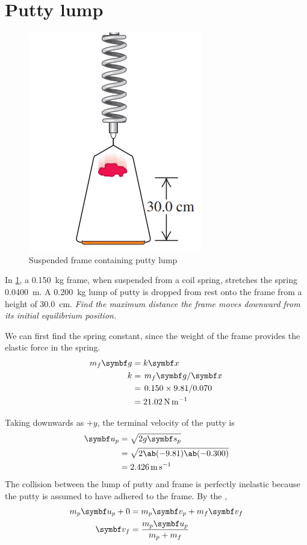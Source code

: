 \section{Putty lump}
\begin{figure}
  \centering
  \includegraphics[scale=0.5]{assets/puttylump.png}
  \caption{Suspended frame containing putty lump}
  \label{fig:puttylump}
\end{figure}
In \cref{fig:puttylump}, a \qty{0.150}{\kg} frame, when suspended from a coil
spring, stretches the spring \qty{0.0400}{\metre}. A \qty{0.200}{\kg} lump of
putty is dropped from rest onto the frame from a height of \qty{30.0}{\cm}.
\it{Find the maximum distance the frame moves downward from its
initial equilibrium position.}

We can first find the spring constant, since the weight of the frame
provides the elastic force in the spring.
\begin{align*}
  m_f\mv{g} &= k\mv{x} \\
  k &= \lf{m_f\mv{g}}{\mv{x}} \\
  &= \lf{0.150\times 9.81}{0.070} \\
  &= \qty{21.02}{\newton\per\metre}
\end{align*}

Taking downwards as \(+y\), the terminal velocity of the putty is
\begin{align*}
  \mv{u}_p &= \sqrt{2g\mv{s}_p} \\
  &= \sqrt{2\ab(-9.81)\ab(-0.300)} \\
  &= \qty{2.426}{\metre\per\second}
\end{align*}
The collision between the lump of putty and frame is perfectly
inelastic because the putty is assumed to
have adhered to the frame. By the ,
\begin{align*}
  m_p\mv{u}_p + 0 &= m_p\mv{v}_p + m_f\mv{v}_f \\
  \mv{v}_f &= \f{m_p\mv{u}_p}{m_p + m_f}
\end{align*}

